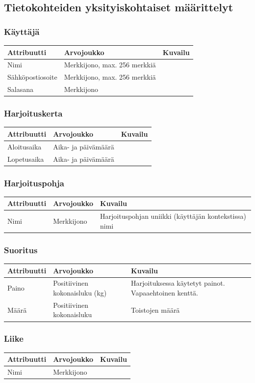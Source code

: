 \documentclass{article}
\begin{document}
\subsection{Tietokohteiden yksityiskohtaiset määrittelyt}
\subsubsection{Käyttäjä}
\begin{tabu} to\textwidth { | X[1,L] | X[1,L] | X[2,L] | }
  \hline
    \textbf{Attribuutti} & \textbf{Arvojoukko} & \textbf{Kuvailu} \\
  \hline
    Nimi & Merkkijono, max. 256 merkkiä & \\
  \hline
    Sähköpostiosoite & Merkkijono, max. 256 merkkiä & \\
  \hline
    Salasana & Merkkijono & \\
  \hline
\end{tabu}

\subsubsection{Harjoituskerta}
\begin{tabu} to\textwidth { | X[1,L] | X[1,L] | X[2,L] | }
  \hline
    \textbf{Attribuutti} & \textbf{Arvojoukko} & \textbf{Kuvailu} \\
  \hline
     Aloitusaika & Aika- ja päivämäärä & \\
  \hline
     Lopetusaika & Aika- ja päivämäärä & \\
  \hline
\end{tabu}

\subsubsection{Harjoituspohja}
\begin{tabu} to\textwidth { | X[1,L] | X[1,L] | X[2,L] | }
  \hline
    \textbf{Attribuutti} & \textbf{Arvojoukko} & \textbf{Kuvailu} \\
  \hline
    Nimi & Merkkijono & Harjoituspohjan uniikki (käyttäjän kontekstissa) nimi \\
  \hline
\end{tabu}

\subsubsection{Suoritus}
\begin{tabu} to\textwidth { | X[1,L] | X[1,L] | X[2,L] | }
  \hline
    \textbf{Attribuutti} & \textbf{Arvojoukko} & \textbf{Kuvailu} \\
  \hline
    Paino & Positiivinen kokonaisluku (kg) & Harjoituksessa käytetyt painot. Vapaaehtoinen kenttä. \\ 
  \hline
    Määrä & Positiivinen kokonaisluku & Toistojen määrä \\
  \hline
\end{tabu}

\subsubsection{Liike}
\begin{tabu} to\textwidth { | X[1,L] | X[1,L] | X[2,L] | }
  \hline
    \textbf{Attribuutti} & \textbf{Arvojoukko} & \textbf{Kuvailu} \\
  \hline
    Nimi & Merkkijono & \\
  \hline
\end{tabu}
\end{document}
